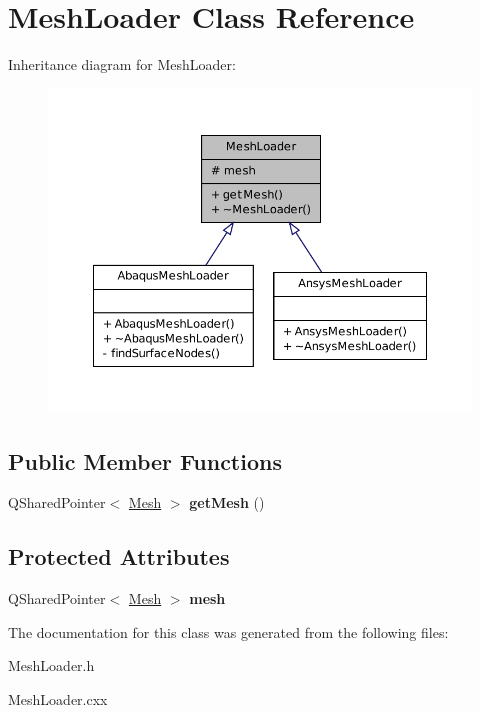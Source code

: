 \hypertarget{class_mesh_loader}{
\section{MeshLoader Class Reference}
\label{class_mesh_loader}
}


Inheritance diagram for MeshLoader:
\nopagebreak
\begin{figure}[H]
\begin{center}
\leavevmode
\includegraphics[width=372pt]{class_mesh_loader__inherit__graph}
\end{center}
\end{figure}
\subsection*{Public Member Functions}
\begin{DoxyCompactItemize}
\item 
\hypertarget{class_mesh_loader_a955f15e898c9c61ad5c70c13e920d5cd}{
QSharedPointer$<$ \hyperlink{class_mesh}{Mesh} $>$ {\bfseries getMesh} ()}
\label{class_mesh_loader_a955f15e898c9c61ad5c70c13e920d5cd}

\end{DoxyCompactItemize}
\subsection*{Protected Attributes}
\begin{DoxyCompactItemize}
\item 
\hypertarget{class_mesh_loader_ad4a225037e9c1d444dc85ef0b5c5625a}{
QSharedPointer$<$ \hyperlink{class_mesh}{Mesh} $>$ {\bfseries mesh}}
\label{class_mesh_loader_ad4a225037e9c1d444dc85ef0b5c5625a}

\end{DoxyCompactItemize}


The documentation for this class was generated from the following files:\begin{DoxyCompactItemize}
\item 
MeshLoader.h\item 
MeshLoader.cxx\end{DoxyCompactItemize}
